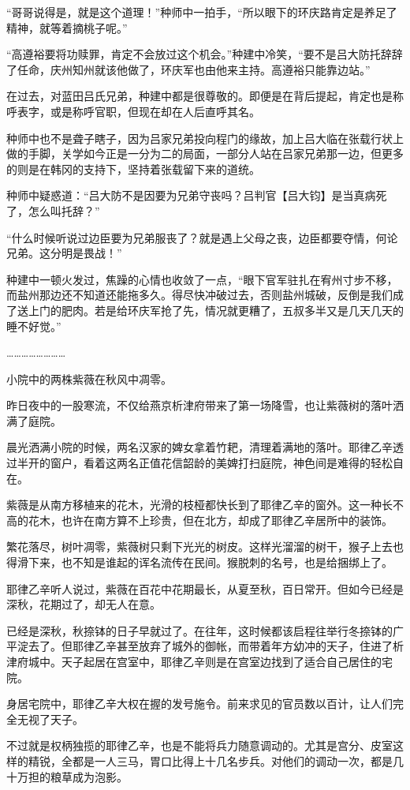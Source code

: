 “哥哥说得是，就是这个道理！”种师中一拍手，“所以眼下的环庆路肯定是养足了精神，就等着摘桃子呢。”

“高遵裕要将功赎罪，肯定不会放过这个机会。”种建中冷笑，“要不是吕大防托辞辞了任命，庆州知州就该他做了，环庆军也由他来主持。高遵裕只能靠边站。”

在过去，对蓝田吕氏兄弟，种建中都是很尊敬的。即便是在背后提起，肯定也是称呼表字，或是称呼官职，但现在却在人后直呼其名。

种师中也不是聋子瞎子，因为吕家兄弟投向程门的缘故，加上吕大临在张载行状上做的手脚，关学如今正是一分为二的局面，一部分人站在吕家兄弟那一边，但更多的则是在韩冈的支持下，坚持着张载留下来的道统。

种师中疑惑道：“吕大防不是因要为兄弟守丧吗？吕判官【吕大钧】是当真病死了，怎么叫托辞？”

“什么时候听说过边臣要为兄弟服丧了？就是遇上父母之丧，边臣都要夺情，何论兄弟。这分明是畏战！”

种建中一顿火发过，焦躁的心情也收敛了一点，“眼下官军驻扎在宥州寸步不移，而盐州那边还不知道还能拖多久。得尽快冲破过去，否则盐州城破，反倒是我们成了送上门的肥肉。若是给环庆军抢了先，情况就更糟了，五叔多半又是几天几天的睡不好觉。”

……………………

小院中的两株紫薇在秋风中凋零。

昨日夜中的一股寒流，不仅给燕京析津府带来了第一场降雪，也让紫薇树的落叶洒满了庭院。

晨光洒满小院的时候，两名汉家的婢女拿着竹耙，清理着满地的落叶。耶律乙辛透过半开的窗户，看着这两名正值花信韶龄的美婢打扫庭院，神色间是难得的轻松自在。

紫薇是从南方移植来的花木，光滑的枝桠都快长到了耶律乙辛的窗外。这一种长不高的花木，也许在南方算不上珍贵，但在北方，却成了耶律乙辛居所中的装饰。

繁花落尽，树叶凋零，紫薇树只剩下光光的树皮。这样光溜溜的树干，猴子上去也得滑下来，也不知是谁起的诨名流传在民间。猴脱刺的名号，也是给捆绑上了。

耶律乙辛听人说过，紫薇在百花中花期最长，从夏至秋，百日常开。但如今已经是深秋，花期过了，却无人在意。

已经是深秋，秋捺钵的日子早就过了。在往年，这时候都该启程往举行冬捺钵的广平淀去了。但耶律乙辛甚至放弃了城外的御帐，而带着年方幼冲的天子，住进了析津府城中。天子起居在宫室中，耶律乙辛则是在宫室边找到了适合自己居住的宅院。

身居宅院中，耶律乙辛大权在握的发号施令。前来求见的官员数以百计，让人们完全无视了天子。

不过就是权柄独揽的耶律乙辛，也是不能将兵力随意调动的。尤其是宫分、皮室这样的精锐，全都是一人三马，胃口比得上十几名步兵。对他们的调动一次，都是几十万担的粮草成为泡影。

